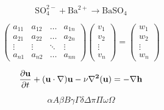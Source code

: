 \documentclass{article}
\begin{document}
    $$\mathrm{SO_4^{2-}+Ba^{2+} \to BaSO_4 }$$

    \begin{equation*}
    \begin{pmatrix}
    a_{11}&a_{12}&\dots&a_{1n}\\
    a_{21}&a_{22}&\dots&a_{2n}\\
    \vdots&\vdots&\ddots&\vdots\\
    a_{n1}&a_{n2}&\dots&a_{nn}
    \end{pmatrix}
    \begin{pmatrix}
    v_{1}\\
    v_{2}\\
    \vdots\\
    v_{n}
    \end{pmatrix}
    =
    \begin{pmatrix}
    w_{1}\\
    w_{2}\\
    \vdots\\
    w_{n}
    \end{pmatrix}
    \end{equation*}

    \begin{equation*}
    \frac{\partial{\bf{u}}}{\partial{t}}+(\bf{u}\cdot\nabla)\bf{u}-\nu\nabla^2\bf(u)=-\nabla h
    \end{equation*}

    \[             %
    \alpha A \beta B \gamma \Gamma \delta \Delta \pi \Pi \omega \Omega 
    \]
\end{document}
